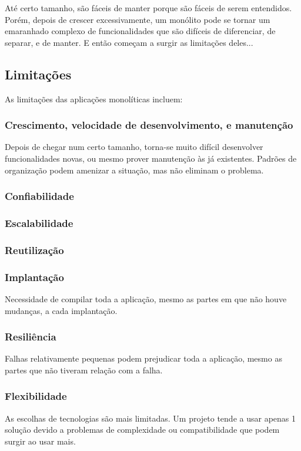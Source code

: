 Até certo tamanho, são fáceis de manter porque são fáceis de serem entendidos. Porém, depois de crescer excessivamente, um monólito pode se tornar um emaranhado complexo de funcionalidades que são difíceis de diferenciar, de separar, e de manter. E então começam a surgir as limitações deles...

\subsection{Limitações}\label{subsection-monolitos-limitacoes}

As limitações das aplicações monolíticas incluem:

\subsubsection*{Crescimento, velocidade de desenvolvimento, e manutenção}
Depois de chegar num certo tamanho, torna-se muito difícil desenvolver funcionalidades novas, ou mesmo prover manutenção às já existentes. Padrões de organização podem amenizar a situação, mas não eliminam o problema.

\subsubsection*{Confiabilidade}


\subsubsection*{Escalabilidade}


\subsubsection*{Reutilização}


\subsubsection*{Implantação}
Necessidade de compilar toda a aplicação, mesmo as partes em que não houve mudanças, a cada implantação.

\subsubsection*{Resiliência}
Falhas relativamente pequenas podem prejudicar toda a aplicação, mesmo as partes que não tiveram relação com a falha.

\subsubsection*{Flexibilidade}
As escolhas de tecnologias são mais limitadas. Um projeto tende a usar apenas 1 solução devido a problemas de complexidade ou compatibilidade que podem surgir ao usar mais.

